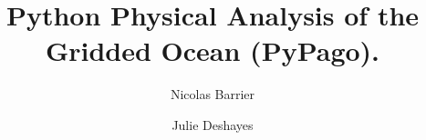 \documentclass[12pt]{article}
\begin{document}
\title{Python Physical Analysis of the Gridded Ocean (PyPago).}
\author{Nicolas Barrier \and Julie Deshayes}
\maketitle
\tableofcontents
\clearpage


\clearpage


\clearpage


\clearpage


\clearpage


\clearpage


\clearpage


\clearpage


\clearpage
\end{document}
